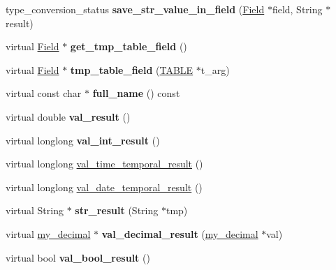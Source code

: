 \begin{DoxyCompactItemize}
type\+\_\+conversion\+\_\+status {\bfseries save\+\_\+str\+\_\+value\+\_\+in\+\_\+field} (\mbox{\hyperlink{classField}{Field}} $\ast$field, String $\ast$result)
\item 
\mbox{\label{classItem_ac7627e7f4c470436c64ea1c1ae6af469}} 
virtual \mbox{\hyperlink{classField}{Field}} $\ast$ {\bfseries get\+\_\+tmp\+\_\+table\+\_\+field} ()
\item 
\mbox{\label{classItem_a9c963062ee91b6735d2fc219143f1c82}} 
virtual \mbox{\hyperlink{classField}{Field}} $\ast$ {\bfseries tmp\+\_\+table\+\_\+field} (\mbox{\hyperlink{structTABLE}{T\+A\+B\+LE}} $\ast$t\+\_\+arg)
\item 
\mbox{\label{classItem_ae2d9dc78264657693b2ec5e310906f78}} 
virtual const char $\ast$ {\bfseries full\+\_\+name} () const
\item 
\mbox{\label{classItem_a42554d7016ea643d6534e332caafe23f}} 
virtual double {\bfseries val\+\_\+result} ()
\item 
\mbox{\label{classItem_a19d0d5eb817c874eb30cdbab8e767a0b}} 
virtual longlong {\bfseries val\+\_\+int\+\_\+result} ()
\item 
virtual longlong \mbox{\hyperlink{classItem_a9d011d3f1d2498f46bbdc4c06d47d5f0}{val\+\_\+time\+\_\+temporal\+\_\+result}} ()
\item 
virtual longlong \mbox{\hyperlink{classItem_aa66204e63dc471de5be79e2da81ac7aa}{val\+\_\+date\+\_\+temporal\+\_\+result}} ()
\item 
\mbox{\label{classItem_ac633994ecb3be1fd5306aafd9634355f}} 
virtual String $\ast$ {\bfseries str\+\_\+result} (String $\ast$tmp)
\item 
\mbox{\label{classItem_a9d5860d6cb7b7fa372bb6d76435157b4}} 
virtual \mbox{\hyperlink{classmy__decimal}{my\+\_\+decimal}} $\ast$ {\bfseries val\+\_\+decimal\+\_\+result} (\mbox{\hyperlink{classmy__decimal}{my\+\_\+decimal}} $\ast$val)
\item 
\mbox{\label{classItem_a8e6ee12189f1395c2c0de63a34fe0534}} 
virtual bool {\bfseries val\+\_\+bool\+\_\+result} ()
\item 
\mbox{\label{classItem_af2227d52b2b68138990eb31171dbff10}} 

\end{DoxyCompactItemize}
